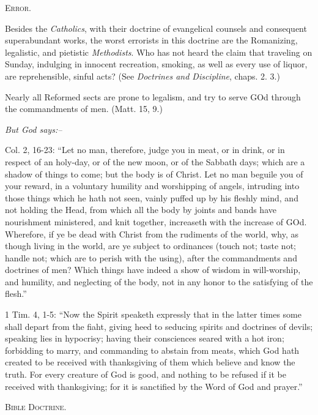 \documentclass[
]{book}
\begin{document}
\begin{center}
\textsc{Error.}
\end{center}

Besides the \emph{Catholics}, with their doctrine of evangelical counsels and consequent superabundant works, the worst errorists in this doctrine are the Romanizing, legalistic, and pietistic \emph{Methodists}. Who has not heard the claim that traveling on Sunday, indulging in innocent recreation, smoking, as well as every use of liquor, are reprehensible, sinful acts? (See \emph{Doctrines and Discipline}, chaps. 2. 3.)

Nearly all Reformed sects are prone to legalism, and try to serve GOd through the commandments of men. (Matt. 15, 9.)

\begin{center}
\textsl{But God says:--}
\end{center}

Col. 2, 16-23: ``Let no man, therefore, judge you in meat, or in drink, or in respect of an holy-day, or of the new moon, or of the Sabbath days; which are a shadow of things to come; but the body is of Christ. Let no man beguile you of your reward, in a voluntary humility and worshipping of angels, intruding into those things which he hath not seen, vainly puffed up by his fleshly mind, and not holding the Head, from which all the body by joints and bands have nourishment ministered, and knit together, increaseth with the increase of GOd. Wherefore, if ye be dead with Christ from the rudiments of the world, why, as though living in the world, are ye subject to ordinances (touch not; taste not; handle not; which are to perish with the using), after the commandments and doctrines of men? Which things have indeed a show of wisdom in will-worship, and humility, and neglecting of the body, not in any honor to the satisfying of the flesh.''

1 Tim. 4, 1-5: ``Now the Spirit speaketh expressly that in the latter times some shall depart from the fiaht, giving heed to seducing spirits and doctrines of devils; speaking lies in hypocrisy; having their consciences seared with a hot iron; forbidding to marry, and commanding to abstain from meats, which God hath created to be received with thanksgiving of them which believe and know the truth. For every creature of God is good, and nothing to be refused if it be received with thanksgiving; for it is sanctified by the Word of God and prayer.''

\begin{center}
\textsc{Bible Doctrine.}
\end{center}
\end{document}
